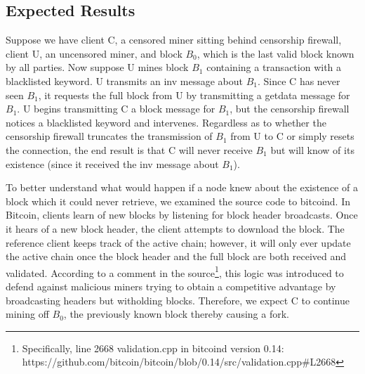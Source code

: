 \usetikzlibrary{arrows.meta}

\subsection{Expected Results}
Suppose we have client C, a censored miner sitting behind censorship firewall,  client U, an uncensored miner, and block $B_0$, which is the last valid block known by all parties. Now suppose U mines block $B_1$ containing a transaction with a blacklisted keyword. U transmits an inv message about $B_1$. Since C has never seen $B_1$, it requests the full block from U by transmitting a getdata message for $B_1$. U begins transmitting C a block message for $B_1$, but the censorship firewall notices a blacklisted keyword and intervenes.
Regardless as to whether the censorship firewall truncates the transmission of $B_1$ from U to C or simply resets the connection, the end result is that C will never receive $B_1$ but will know of its existence (since it received the inv message about $B_1$).

To better understand what would happen if a node knew about the existence of a block which it could never retrieve, we examined the source code to bitcoind. In Bitcoin, clients learn of new blocks by listening for block header broadcasts. Once it hears of a new block header, the client attempts to download the block. The reference client keeps track of the active chain; however, it will only ever update the active chain once the block header and the full block are both received and validated. According to a comment in the source\footnote{Specifically, line 2668 validation.cpp in bitcoind version 0.14: https://github.com/bitcoin/bitcoin/blob/0.14/src/validation.cpp#L2668}, this logic was introduced to defend against malicious miners trying to obtain a competitive advantage by broadcasting headers but witholding blocks. Therefore, we expect C to continue mining off $B_0$, the previously known block thereby causing a fork.


